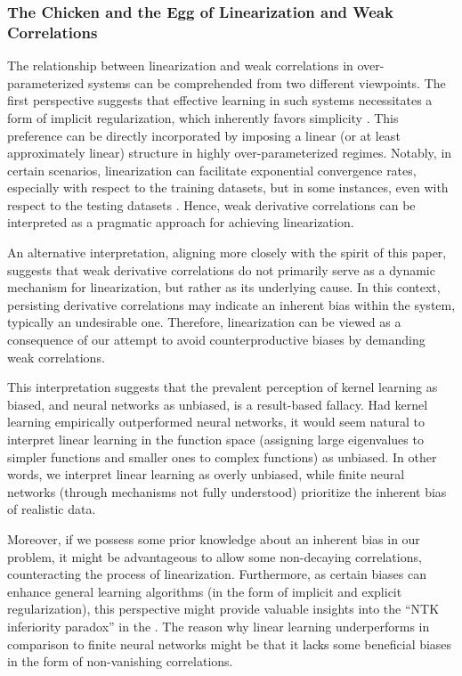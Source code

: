 \documentclass{article} %
\begin{document}
\subsubsection{The Chicken and the Egg of Linearization and Weak Correlations}
\label{sec:ChickenAndEgg}

The relationship between linearization and weak correlations in over-parameterized systems can be comprehended from two different viewpoints. The first perspective suggests that effective learning in such systems necessitates a form of implicit regularization, which inherently favors simplicity \cite{Belkin2019}. This preference can be directly incorporated by imposing a linear (or at least approximately linear) structure in highly over-parameterized regimes. Notably, in certain scenarios, linearization can facilitate exponential convergence rates, especially with respect to the training datasets, but in some instances, even with respect to the testing datasets \cite{ConvergenceOverparameterization2019,WideNNEvLinGD2019,GradientDescentfindsGlobal2019,AConvergenceOverPar2019,sgd2017daniely,Learningoverparameterized2018,Gradientdescentprovably2018,HowNNExtrapolate2020,LearningAndGeneralization2019}. Hence, weak derivative correlations can be interpreted as a pragmatic approach for achieving linearization.

An alternative interpretation, aligning more closely with the spirit of this paper, suggests that weak derivative correlations do not primarily serve as a dynamic mechanism for linearization, but rather as its underlying cause. In this context, persisting derivative correlations may indicate an inherent bias within the system, typically an undesirable one. Therefore, linearization can be viewed as a consequence of our attempt to avoid counterproductive biases by demanding weak correlations.

This interpretation suggests that the prevalent perception of kernel learning as biased, and neural networks as unbiased, is a result-based fallacy. Had kernel learning empirically outperformed neural networks, it would seem natural to interpret linear learning in the function space (assigning large eigenvalues to simpler functions and smaller ones to complex functions) as unbiased. In other words, we interpret linear learning as overly unbiased, while finite neural networks (through mechanisms not fully understood) prioritize the inherent bias of realistic data.

Moreover, if we possess some prior knowledge about an inherent bias in our problem, it might be advantageous to allow some non-decaying correlations, counteracting the process of linearization. Furthermore, as certain biases can enhance general learning algorithms (in the form of implicit and explicit regularization), this perspective might provide valuable insights into the ``NTK inferiority paradox'' in the . The reason why linear learning underperforms in comparison to finite neural networks might be that it \textcolor{black}{lacks} some beneficial biases in the form of non-vanishing correlations. 
\end{document}
